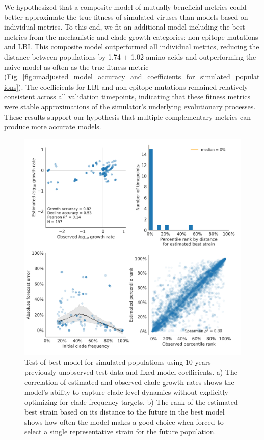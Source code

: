 We hypothesized that a composite model of mutually beneficial metrics could better approximate the true fitness of simulated viruses than models based on individual metrics.
To this end, we fit an additional model including the best metrics from the mechanistic and clade growth categories: non-epitope mutations and LBI.
This composite model outperformed all individual metrics, reducing the distance between populations by 1.74 $\pm$ 1.02 amino acids and outperforming the naive model as often as the true fitness metric (Fig.~\ref{fig:unadjusted_model_accuracy_and_coefficients_for_simulated_populations}).
The coefficients for LBI and non-epitope mutations remained relatively consistent across all validation timepoints, indicating that these fitness metrics were stable approximations of the simulator's underlying evolutionary processes.
These results support our hypothesis that multiple complementary metrics can produce more accurate models.

\begin{figure}[ht]
  \begin{center}
  \includegraphics[width=\textwidth]{figures/test-of-best-model-for-simulated-populations.png}
  \caption{
  Test of best model for simulated populations using 10 years previously unobserved test data and fixed model coefficients.
  a) The correlation of estimated and observed clade growth rates shows the model's ability to capture clade-level dynamics without explicitly optimizing for clade frequency targets.
  b) The rank of the estimated best strain based on its distance to the future in the best model shows how often the model makes a good choice when forced to select a single representative strain for the future population.
  }
  \label{fig:test_of_best_model_for_simulated_populations}
  \end{center}
\end{figure}

